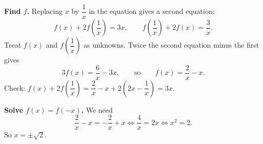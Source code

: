 \textbf{Find $f$.} Replacing $x$ by $\dfrac{1}{x}$ in the equation gives a second equation:
\[
f(x)+2f\!\left(\dfrac{1}{x}\right)=3x,\qquad f\!\left(\dfrac{1}{x}\right)+2f(x)=\dfrac{3}{x} .
\]
Treat $f(x)$ and $f\!\left(\dfrac{1}{x}\right)$ as unknowns. Twice the second equation minus the first gives
\[
3f(x)=\dfrac{6}{x}-3x,\qquad\text{so}\qquad f(x)=\dfrac{2}{x}-x .
\]
Check: $f(x)+2f\!\left(\dfrac{1}{x}\right)=\dfrac{2}{x}-x+2\left(2x-\dfrac{1}{x}\right)=3x$.

\textbf{Solve $f(x)=f(-x)$.} We need
\[
\dfrac{2}{x}-x=-\dfrac{2}{x}+x\iff\dfrac{4}{x}=2x\iff x^2=2 .
\]
So $x=\boxed{\pm\sqrt2}$.
